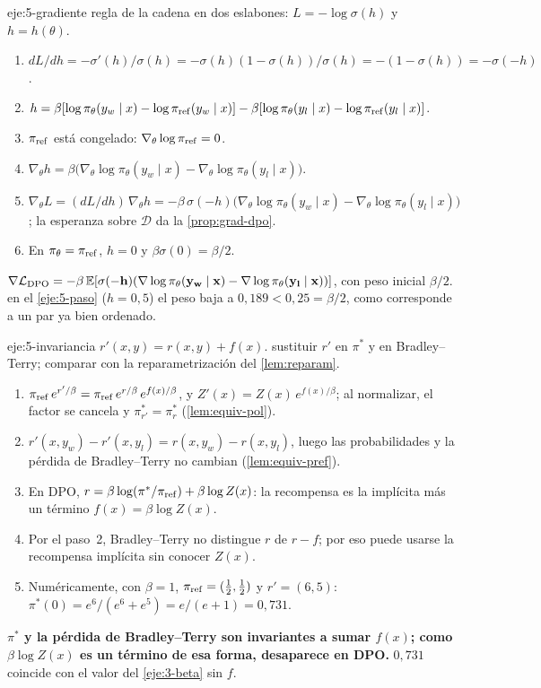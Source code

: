 \begin{solucion}{eje:5-gradiente}
\planteamiento regla de la cadena en dos eslabones: $L=-\log\sigma(h)$ y $h=h(\theta)$.
\pasos
\begin{enumerate}[label=\arabic*.]
  \item $dL/dh=-\sigma'(h)/\sigma(h)=-\sigma(h)(1-\sigma(h))/\sigma(h)=-(1-\sigma(h))=-\sigma(-h)$.
  \item $h=\beta[\log\pi_\theta(y_w\mid x)-\log\pi_{\mathrm{ref}}(y_w\mid x)]-\beta[\log\pi_\theta(y_l\mid x)-\log\pi_{\mathrm{ref}}(y_l\mid x)]$.
  \item $\pi_{\mathrm{ref}}$ está congelado: $\nabla_\theta\log\pi_{\mathrm{ref}}=0$.
  \item $\nabla_\theta h=\beta\bigl(\nabla_\theta\log\pi_\theta(y_w\mid x)-\nabla_\theta\log\pi_\theta(y_l\mid x)\bigr)$.
  \item $\nabla_\theta L=(dL/dh)\,\nabla_\theta h=-\beta\,\sigma(-h)\bigl(\nabla_\theta\log\pi_\theta(y_w\mid x)-\nabla_\theta\log\pi_\theta(y_l\mid x)\bigr)$; la esperanza sobre $\mathcal{D}$ da la \cref{prop:grad-dpo}.
  \item En $\pi_\theta=\pi_{\mathrm{ref}}$, $h=0$ y $\beta\sigma(0)=\beta/2$.
\end{enumerate}
\resultado $\mathbf{\nabla\mathcal{L}_{\mathrm{DPO}}=-\beta\,\mathbb{E}[\sigma(-h)(\nabla\log\pi_\theta(y_w\mid x)-\nabla\log\pi_\theta(y_l\mid x))]}$, con peso inicial $\beta/2$.
\comprobacion en el \cref{eje:5-paso} ($h=0{,}5$) el peso baja a $0{,}189<0{,}25=\beta/2$, como corresponde a un par ya bien ordenado.
\end{solucion}

\begin{solucion}{eje:5-invariancia}
\datos $r'(x,y)=r(x,y)+f(x)$.
\planteamiento sustituir $r'$ en $\pi^{*}$ y en Bradley--Terry; comparar con la reparametrización del \cref{lem:reparam}.
\pasos
\begin{enumerate}[label=\arabic*.]
  \item $\pi_{\mathrm{ref}}\,e^{r'/\beta}=\pi_{\mathrm{ref}}\,e^{r/\beta}\,e^{f(x)/\beta}$, y $Z'(x)=Z(x)\,e^{f(x)/\beta}$; al normalizar, el factor se cancela y $\pi^{*}_{r'}=\pi^{*}_r$ (\cref{lem:equiv-pol}).
  \item $r'(x,y_w)-r'(x,y_l)=r(x,y_w)-r(x,y_l)$, luego las probabilidades y la pérdida de Bradley--Terry no cambian (\cref{lem:equiv-pref}).
  \item En DPO, $r=\beta\log(\pi^{*}/\pi_{\mathrm{ref}})+\beta\log Z(x)$: la recompensa es la implícita más un término $f(x)=\beta\log Z(x)$.
  \item Por el paso~2, Bradley--Terry no distingue $r$ de $r-f$; por eso puede usarse la recompensa implícita sin conocer $Z(x)$.
  \item Numéricamente, con $\beta=1$, $\pi_{\mathrm{ref}}=(\tfrac12,\tfrac12)$ y $r'=(6,5)$: $\pi^{*}(0)=e^{6}/(e^{6}+e^{5})=e/(e+1)=0{,}731$.
\end{enumerate}
\resultado \textbf{$\pi^{*}$ y la pérdida de Bradley--Terry son invariantes a sumar $f(x)$; como $\beta\log Z(x)$ es un término de esa forma, desaparece en DPO.}
\comprobacion $0{,}731$ coincide con el valor del \cref{eje:3-beta} sin $f$.
\end{solucion}

